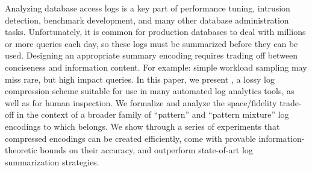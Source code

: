 Analyzing database access logs is a key part of performance tuning, intrusion detection, benchmark development, and many other database administration tasks.
Unfortunately, it is common for production databases to deal with millions or more queries each day, so these logs must be summarized before they can be used.
Designing an appropriate summary encoding requires trading off between conciseness and information content.
For example: simple workload sampling may miss rare, but high impact queries.
In this paper, we present \systemnameone, a lossy log compression scheme suitable for use in many automated log analytics tools, as well as for human inspection.
We formalize and analyze the space/fidelity trade-off in the context of a broader family of ``pattern'' and ``pattern mixture'' log encodings to which \systemnameone belongs.
We show through a series of experiments that \systemnameone compressed encodings can be created efficiently, come with provable information-theoretic bounds on their accuracy, and outperform state-of-art log summarization strategies.
